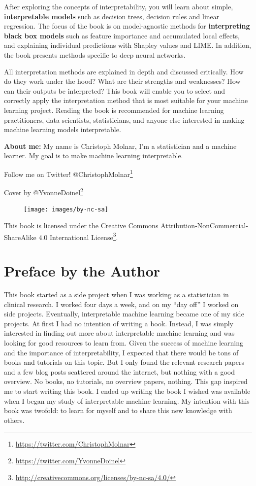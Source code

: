 \documentclass[
  11pt,
]{scrbook}
\renewcommand{\href}[2]{#2\footnote{\url{#1}}}
\begin{document}
After exploring the concepts of interpretability, you will learn about simple, \textbf{interpretable models} such as decision trees, decision rules and linear regression.
The focus of the book is on model-agnostic methods for \textbf{interpreting black box models} such as feature importance and accumulated local effects, and explaining individual predictions with Shapley values and LIME.
In addition, the book presents methods specific to deep neural networks.

All interpretation methods are explained in depth and discussed critically.
How do they work under the hood?
What are their strengths and weaknesses?
How can their outputs be interpreted?
This book will enable you to select and correctly apply the interpretation method that is most suitable for your machine learning project.
Reading the book is recommended for machine learning practitioners, data scientists, statisticians, and anyone else interested in making machine learning models interpretable.

\textbf{About me:} My name is Christoph Molnar, I'm a statistician and a machine learner.
My goal is to make machine learning interpretable.

Follow me on Twitter! \href{https://twitter.com/ChristophMolnar}{@ChristophMolnar}

Cover by \href{https://twitter.com/YvonneDoinel}{@YvonneDoinel}

\begin{figure}

{\centering \texttt{[image: images/by-nc-sa]} 

}

\end{figure}

This book is licensed under the \href{http://creativecommons.org/licenses/by-nc-sa/4.0/}{Creative Commons Attribution-NonCommercial-ShareAlike 4.0 International License}.

\hypertarget{preface-by-the-author}{%
\chapter{Preface by the Author}\label{preface-by-the-author}}

This book started as a side project when I was working as a statistician in clinical research.
I worked four days a week, and on my ``day off'' I worked on side projects.
Eventually, interpretable machine learning became one of my side projects.
At first I had no intention of writing a book.
Instead, I was simply interested in finding out more about interpretable machine learning and was looking for good resources to learn from.
Given the success of machine learning and the importance of interpretability, I expected that there would be tons of books and tutorials on this topic.
But I only found the relevant research papers and a few blog posts scattered around the internet, but nothing with a good overview.
No books, no tutorials, no overview papers, nothing.
This gap inspired me to start writing this book.
I ended up writing the book I wished was available when I began my study of interpretable machine learning.
My intention with this book was twofold: to learn for myself and to share this new knowledge with others.
\end{document}
